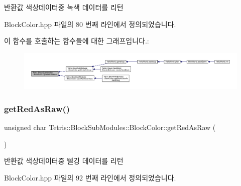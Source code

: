 \begin{DoxyReturn}{반환값}
색상데이터중 녹색 데이터를 리턴 
\end{DoxyReturn}


Block\+Color.\+hpp 파일의 80 번째 라인에서 정의되었습니다.

이 함수를 호출하는 함수들에 대한 그래프입니다.\+:
\nopagebreak
\begin{figure}[H]
\begin{center}
\leavevmode
\includegraphics[width=350pt]{class_tetris_1_1_block_sub_modules_1_1_block_color_a65e9230325a2f44aa433f39c199aabcd_icgraph}
\end{center}
\end{figure}
\mbox{\label{class_tetris_1_1_block_sub_modules_1_1_block_color_a1795cf70c847d261645a9690afff7e9c}} 
\subsubsection{\texorpdfstring{get\+Red\+As\+Raw()}{getRedAsRaw()}}
{\footnotesize\ttfamily unsigned char Tetris\+::\+Block\+Sub\+Modules\+::\+Block\+Color\+::get\+Red\+As\+Raw (\begin{DoxyParamCaption}{ }\end{DoxyParamCaption})\hspace{0.3cm}{\ttfamily [inline]}}

\begin{DoxyReturn}{반환값}
색상데이터중 삘깅 데이터를 리턴 
\end{DoxyReturn}


Block\+Color.\+hpp 파일의 92 번째 라인에서 정의되었습니다.

